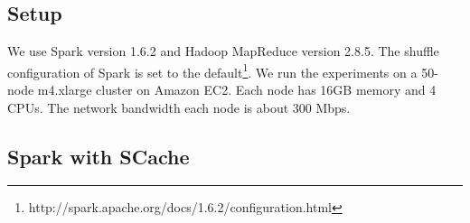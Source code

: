 

\subsection{Setup}\label{stepup}
We use Spark version 1.6.2 and Hadoop MapReduce version 2.8.5.
The shuffle configuration of Spark is set to the default\footnote{http://spark.apache.org/docs/1.6.2/configuration.html}. 
We run the experiments on a 50-node m4.xlarge cluster on Amazon EC2.
Each node has 16GB memory and 4 CPUs.
The network bandwidth each node is about 300 Mbps.

\subsection{Spark with SCache}\label{sparkscache}


